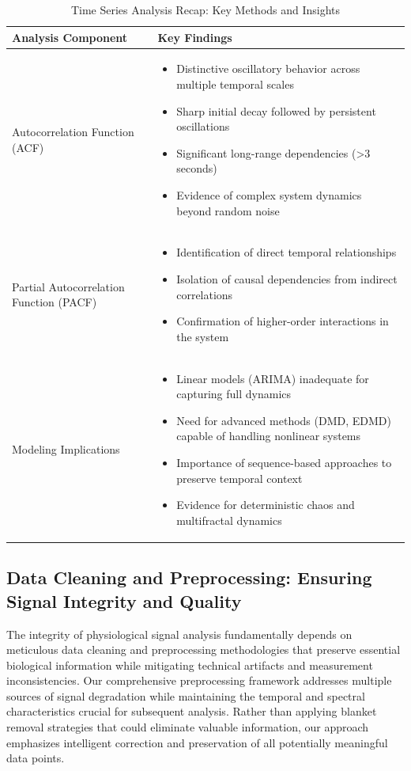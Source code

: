 \documentclass[a4paper,12pt,twoside]{article}
\begin{document}
\begin{table}[H]
\centering
\caption{Time Series Analysis Recap: Key Methods and Insights}
\begin{tabular}{|p{3cm}|p{11cm}|}
\hline
\textbf{Analysis Component} & \textbf{Key Findings} \\
\hline
Autocorrelation Function (ACF) & 
\begin{itemize}
  \item Distinctive oscillatory behavior across multiple temporal scales
  \item Sharp initial decay followed by persistent oscillations
  \item Significant long-range dependencies (>3 seconds)
  \item Evidence of complex system dynamics beyond random noise
\end{itemize} \\
\hline
Partial Autocorrelation Function (PACF) & 
\begin{itemize}
  \item Identification of direct temporal relationships 
  \item Isolation of causal dependencies from indirect correlations
  \item Confirmation of higher-order interactions in the system
\end{itemize} \\
\hline
Modeling Implications & 
\begin{itemize}
  \item Linear models (ARIMA) inadequate for capturing full dynamics
  \item Need for advanced methods (DMD, EDMD) capable of handling nonlinear systems
  \item Importance of sequence-based approaches to preserve temporal context
  \item Evidence for deterministic chaos and multifractal dynamics
\end{itemize} \\
\hline
\end{tabular}
\label{tab:time_series_analysis_summary}
\end{table}

\subsection{Data Cleaning and Preprocessing: Ensuring Signal Integrity and Quality}

The integrity of physiological signal analysis fundamentally depends on meticulous data cleaning and preprocessing methodologies that preserve essential biological information while mitigating technical artifacts and measurement inconsistencies. Our comprehensive preprocessing framework addresses multiple sources of signal degradation while maintaining the temporal and spectral characteristics crucial for subsequent analysis. Rather than applying blanket removal strategies that could eliminate valuable information, our approach emphasizes intelligent correction and preservation of all potentially meaningful data points.
\end{document}
